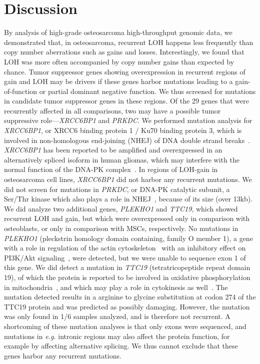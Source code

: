 \section{Discussion}\label{discussion8}
By analysis of high\hyp{}grade osteosarcoma high\hyp{}throughput genomic data, we demonstrated that, in osteosarcoma, recurrent LOH happens less frequently than copy number aberrations such as gains and losses. Interestingly, we found that LOH was more often accompanied by copy number gains than expected by chance. Tumor suppressor genes showing overexpression in recurrent regions of gain and LOH may be drivers if these genes harbor mutations leading to a gain\hyp{}of\hyp{}function or partial dominant negative function. We thus screened for mutations in candidate tumor suppressor genes in these regions. Of the 29 genes that were recurrently affected in all comparisons, two may have a possible tumor suppressive role---{\it XRCC6BP1} and {\it PRKDC}. We performed mutation analysis for {\it XRCC6BP1}, or XRCC6 binding protein 1 / Ku70 binding protein 3, which is involved in non\hyp{}homologous end\hyp{}joining (NHEJ) of DNA double strand breaks~\cite{yang2011genetic}. {\it XRCC6BP1} has been reported to be amplified and overexpressed in an alternatively spliced isoform in human gliomas, which may interfere with the normal function of the DNA-PK complex~\cite{fischer2001kub3}. In regions of LOH-gain in osteosarcoma cell lines, {\it XRCC6BP1} did not harbor any recurrent mutations. We did not screen for mutations in {\it PRKDC}, or DNA-PK catalytic subunit, a Ser/Thr kinase which also plays a role in NHEJ~\cite{chan2002autophosphorylation}, because of its size (over 13kb). We did analyze two additional genes, {\it PLEKHO1} and {\it TTC19}, which showed recurrent LOH and gain, but which were overexpressed only in comparison with osteoblasts, or only in comparison with MSCs, respectively. No mutations in {\it PLEKHO1} (pleckstrin homology domain containing, family O member 1), a gene with a role in regulation of the actin cytoskeleton~\cite{canton2005pleckstrin} with an inhibitory effect on PI3K/Akt signaling~\cite{tokuda2007casein}, were detected, but we were unable to sequence exon 1 of this gene. We did detect a mutation in {\it TTC19} (tetratricopeptide repeat domain 19), of which the protein is reported to be involved in oxidative phosphorylation in mitochondria~\cite{ghezzi2011mutations}, and which may play a role in cytokinesis as well~\cite{sagona2010ptdins}. The mutation detected results in a arginine to glycine substitution at codon 274 of the TTC19 protein and was predicted as possibly damaging. However, the mutation was only found in 1/6 samples analyzed, and is therefore not recurrent. A shortcoming of these mutation analyses is that only exons were sequenced, and mutations in {\it e.g.} intronic regions may also affect the protein function, for example by affecting alternative splicing. We thus cannot exclude that these genes harbor any recurrent mutations.

